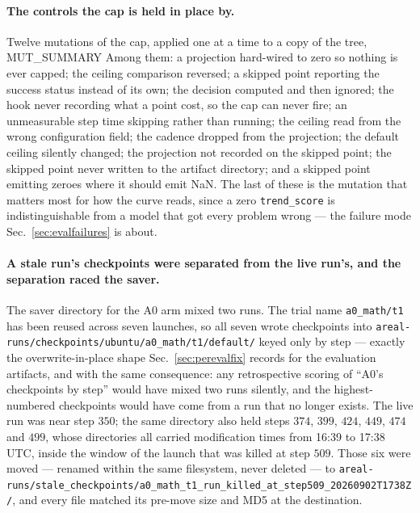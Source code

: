 \paragraph{The controls the cap is held in place by.} Twelve mutations of the cap, applied one
at a time to a copy of the tree, MUT\_SUMMARY Among them: a projection hard-wired to zero
so nothing is ever capped; the ceiling comparison reversed; a skipped point reporting the
success status instead of its own; the decision computed and then ignored; the hook never
recording what a point cost, so the cap can never fire; an unmeasurable step time skipping
rather than running; the ceiling read from the wrong configuration field; the cadence dropped
from the projection; the default ceiling silently changed; the projection not recorded on the
skipped point; the skipped point never written to the artifact directory; and a skipped point
emitting zeroes where it should emit NaN. The last of these is the mutation that matters most
for how the curve reads, since a zero \texttt{trend\_score} is indistinguishable from a model
that got every problem wrong --- the failure mode Sec.~\ref{sec:evalfailures} is about.

\paragraph{A stale run's checkpoints were separated from the live run's, and the separation
raced the saver.} The saver directory for the A0 arm mixed two runs. The trial name
\texttt{a0\_math/t1} has been reused across seven launches, so all seven wrote checkpoints into
\texttt{areal-runs/\allowbreak checkpoints/\allowbreak ubuntu/\allowbreak a0\_math/\allowbreak t1/\allowbreak default/} keyed only by step --- exactly the
overwrite-in-place shape Sec.~\ref{sec:perevalfix} records for the evaluation artifacts, and
with the same consequence: any retrospective scoring of ``A0's checkpoints by step'' would have
mixed two runs silently, and the highest-numbered checkpoints would have come from a run that
no longer exists. The live run was near step $350$; the same directory also held steps $374$,
$399$, $424$, $449$, $474$ and $499$, whose directories all carried modification times from
16:39 to 17:38 UTC, inside the window of the launch that was killed at step $509$. Those six
were moved --- renamed within the same filesystem, never deleted --- to
\texttt{areal-runs/\allowbreak stale\_checkpoints/\allowbreak a0\_math\_t1\_\allowbreak run\_killed\_at\_\allowbreak step509\_20260902T1738Z/},
and every file matched its pre-move size and MD5 at the destination.

